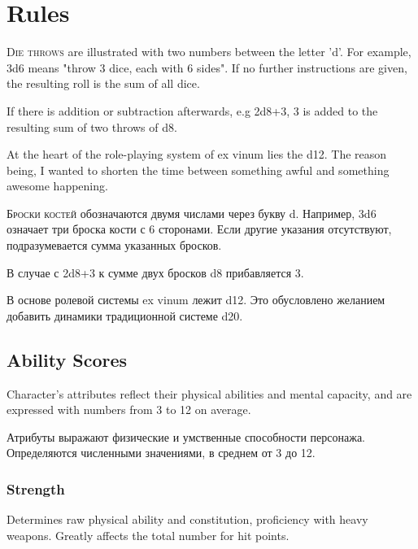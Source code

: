 \documentclass[a5paper,11pt]{book}
\begin{document}
\chapter{Rules}
\begin{multicols}{2}

\begin{en}
\lettrine{D}{ie throws} are illustrated with two numbers between the letter 'd'. For example, 3d6 means "throw 3 dice, each with 6 sides". If no further instructions are given, the resulting roll is the sum of all dice.

If there is addition or subtraction afterwards, e.g 2d8+3, 3 is added to the resulting sum of two throws of d8.

At the heart of the role-playing system of ex vinum lies the d12. The reason being, I wanted to shorten the time between something awful and something awesome happening.
\end{en}

\begin{ru}
\lettrine{Б}{роски костей} обозначаются двумя числами через букву d. Например, 3d6 означает три броска кости с 6 сторонами. Если другие указания отсутствуют, подразумевается сумма указанных бросков.

В случае с 2d8+3 к сумме двух бросков d8 прибавляется 3.

В основе ролевой системы ex vinum лежит d12. Это обусловлено желанием добавить динамики традиционной системе d20.
\end{ru}

\section{Ability Scores}
\begin{en}
Character's attributes reflect their physical abilities and mental capacity, and are expressed with numbers from 3 to 12 on average.
\end{en}

\begin{ru}
Атрибуты выражают физические и умственные способности персонажа. Определяются численными значениями, в среднем от 3 до 12.
\end{ru}

\subsection{Strength}
\begin{en}
Determines raw physical ability and constitution, proficiency with heavy weapons. Greatly affects the total number for hit points.
\end{en}


\end{multicols}
\end{document}
